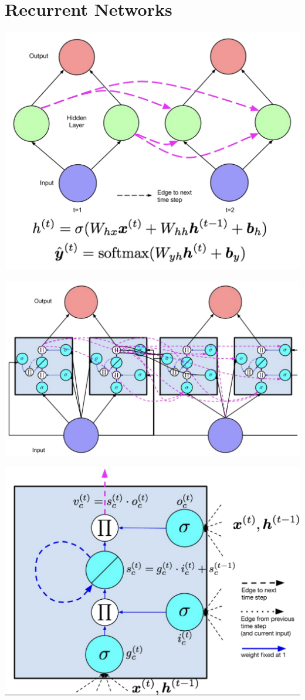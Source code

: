 \section{Recurrent Networks}

\includegraphics[width=0.9\columnwidth]{images/lstm}

\includegraphics[width=0.9\columnwidth]{images/lstm_full}

\includegraphics[width=0.9\columnwidth]{images/memcell}
